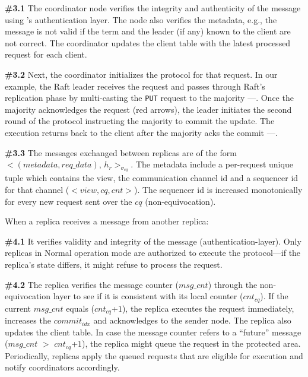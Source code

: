     {\bf{\#3.1}} The coordinator node verifies the integrity and authenticity of the message using \projecttitle{}'s authentication layer. The node also verifies the metadata, e.g., the message is not valid if the term and the leader (if any) known to the client are not correct. The coordinator updates the client table with the latest processed request for each client. 
    
    {\bf{\#3.2}} Next, the coordinator initializes the protocol for that request. In our example, the Raft leader receives the request  and passes through Raft's replication phase by multi-casting the \texttt{PUT} request to the majority ---. Once the majority acknowledges the request (red arrows), the leader initiates the second round of the protocol instructing the majority to commit the update. The execution returns back to the client after the majority acks the commit ---. 
    
    {\bf{\#3.3}} The messages exchanged between replicas are of the form $<(metadata, req\_data)$, $h_{r}>_{\sigma_{cq}}$. The metadata include a per-request unique tuple which contains the view, the communication channel id and a sequencer id for that channel ($<$$view, cq, cnt$$>$). The sequencer id is increased monotonically for every new request sent over the $cq$ (non-equivocation).
    
     When a replica receives a message from another replica:
    
    {\bf{\#4.1}} It verifies validity and integrity of the message (authentication-layer). Only replicas in Normal operation mode are authorized to execute the protocol---if the replica's state differs, it might refuse to process the request.%
    
    {\bf{\#4.2}} The replica verifies the message counter ($msg\_cnt$) through the non-equivocation layer to see if it is consistent with its local counter ($cnt_{cq}$). If the current $msg\_cnt$ equals ($cnt_{cq}$+$1$), the replica executes the request immediately, increases the $commit_{idx}$ and acknowledges to the sender node. The replica also updates the client table. In case the message counter refers to a ``future'' message ($msg\_cnt$ $>$ $cnt_{cq}$+$1$), the replica might queue the request in the protected area. Periodically, \projecttitle{} replicas apply the queued requests that are eligible for execution and notify coordinators accordingly.
    
